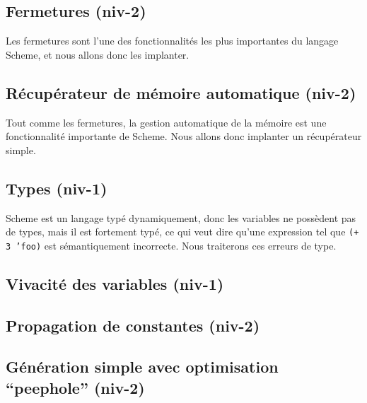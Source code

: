\documentclass[11pt]{article}
\begin{document}
\subsection{Fermetures (niv-2)}

Les fermetures sont l'une des fonctionnalités les plus importantes du
langage Scheme, et nous allons donc les implanter.

\subsection{Récupérateur de mémoire automatique (niv-2)}

Tout comme les fermetures, la gestion automatique de la mémoire est
une fonctionnalité importante de Scheme.  Nous allons donc implanter
un récupérateur simple.

\subsection{Types (niv-1)}

Scheme est un langage typé dynamiquement, donc les variables ne
possèdent pas de types, mais il est fortement typé, ce qui veut dire
qu'une expression tel que \texttt{(+ 3 'foo)} est sémantiquement
incorrecte.  Nous traiterons ces erreurs de type.

\subsection{Vivacité des variables (niv-1)}

\subsection{Propagation de constantes (niv-2)}

\subsection{Génération simple avec optimisation ``peephole'' (niv-2)}
\end{document}
